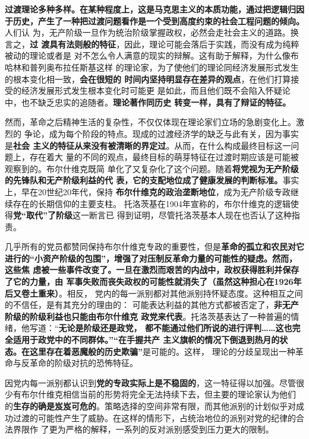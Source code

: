 \textbf{过渡理论多种多样。在某种程度上，这是马克思主义的本质功能，通过把逻辑归因
  于历史，产生了一种把过渡问题看作是一个受到高度约束的社会工程问题的倾向。}人们认
为，无产阶级一旦作为统治阶级掌握政权，必然会走社会主义的道路。换言之，\textbf{过
  渡具有法则般的特征}，因此，理论可能会落后于实践，而没有成为纯粹被动的理论或者是
对不怎么令人满意的现实的辩解。这有助于解释，为什么像布哈林和普列奥布拉任斯基这样
的理论家，为了使他们的理论同经济发展形式发生的根本变化相一致，\textbf{会在很短的
  时间内坚持明显存在差异的观点}，在他们打算接受的经济发展形式发生根本变化时可能更
是如此，而且他们既不会陷入怀疑论中，也不缺乏忠实的追随者。\textbf{理论著作同历史
  转变一样，具有了辩证的特征。}

然而，革命之后精神生活的复杂性，不仅仅体现在理论家们立场的急剧变化上。激烈的
争论，成为每个阶段的特点。现成的过渡经济学的缺乏与此有关，因为事实是\textbf{社会
主义的特征从来没有被清晰的界定过}。从而，在什么构成最终目标这一问题上，存在着大
量的不同的观点，最终目标的萌芽特征在过渡时期应该是可能被观察到的。布尔什维克既简
单化了又复杂化了这个问题。随着\textbf{将党视为无产阶级的先锋队和无产阶级利益的代
表，它的支配地位成了健康发展的判断标准。}事实上，早在20世纪20年代，保持
\textbf{布尔什维克的政治垄断地位}，成为无产阶级专政继续存在的长期信仰的主要支柱。
托洛茨基在1904年宣称的，布尔什维克的逻辑使得\textbf{党“取代”了阶级}这一断言已
得到证明，尽管托洛茨基本人现在也否认了这种指责。

几乎所有的党员都赞同保持布尔什维克专政的重要性，但是\textbf{革命的孤立和农民对它
  进行的“小资产阶级的包围”，增强了对压制反革命力量的可能性的疑虑。然而，这些焦
  虑被一些事件改变了。一旦在激烈而艰苦的内战中，政权获得胜利并保存了它的力量，由
  军事失败而丧失政权的可能性就消失了（虽然这种担心在1926年后又卷土重来）}。相反，
党内的每一派别都对其他派别持怀疑态度。这种相互之间的不信任，是有其充分的理由的：
可能表达利益的其他方式都被否定了，\textbf{非无产阶级的阶级利益也只能由布尔什维克
  政党来代表}。托洛茨基表达了一种普遍的情绪，他写道：“\textbf{无论是阶级还是政党，
  都不能通过他们所说的进行评判……这也完全适用于政党中的不同群体。”“在手握共产
  主义旗帜的情况下倒退到热月的状态。在这里存在着恶魔般的历史欺骗”}是可能的。这样，
理论的分歧呈现出一种革命与反革命的阶级对抗的恐怖特征。

因党内每一派别都认识到\textbf{党的专政实际上是不稳固的}，这一特征得以加强。尽管很
少有布尔什维克相信当前的形势将完全无法持续下去，但主要的理论家认为他们
的\textbf{生存的确是岌岌可危的}。策略选择的空间非常有限，而其他派别的计划似乎对成
功过渡的可能性产生了威胁。在这样的情形下，占统治地位的派别对党的纪律的合法界限作
了更为严格的解释，一系列的反对派别感受到压力更大的限制。

